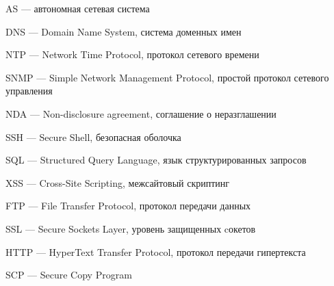 \hypertarget{as}{AS --- автономная сетевая система}

\hypertarget{dns}{DNS --- Domain Name System, система доменных имен}

\hypertarget{ntp}{NTP --- Network Time Protocol, протокол сетевого времени}

\clearpage

\hypertarget{snmp}{SNMP --- Simple Network Management Protocol, простой протокол сетевого управления}

\hypertarget{nda}{NDA --- Non-disclosure agreement, соглашение о неразглашении}

\hypertarget{ssh}{SSH --- Secure Shell, безопасная оболочка}

\hypertarget{sql}{SQL --- Structured Query Language, язык структурированных запросов}

\hypertarget{xss}{XSS --- Cross-Site Scripting, межсайтовый скриптинг}

\hypertarget{ftp}{FTP --- File Transfer Protocol, протокол передачи данных}

\hypertarget{ssl}{SSL --- Secure Sockets Layer, уровень защищенных cокетов}

\hypertarget{http}{HTTP --- HyperText Transfer Protocol, протокол передачи гипертекста}

\hypertarget{scp}{SCP --- Secure Copy Program}

\clearpage
